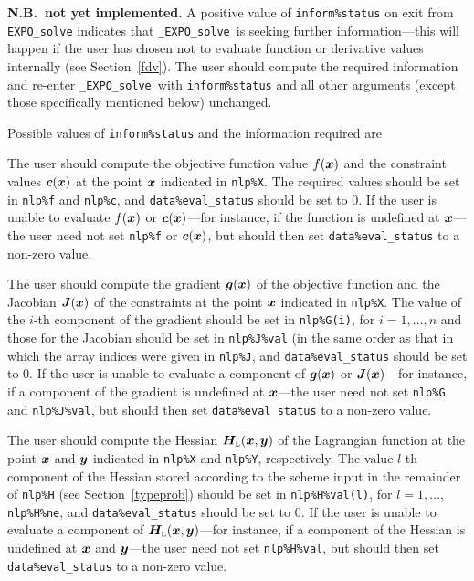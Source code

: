 \documentclass{galahad}
\newcommand{\packagename}{EXPO}
\newcommand{\fullpackagename}{\libraryname\_\packagename}
\newcommand{\solver}{{\tt \fullpackagename\_solve}}
\newcommand{\bmHL}{\bmH\sub{L}}
\begin{document}
{\bf N.B.\ not yet implemented.}
A positive value of {\tt inform\%status} on exit from
{\tt \packagename\_solve}
indicates that
\solver\ is seeking further information---this will happen
if the user has chosen not to evaluate function or
derivative values internally (see Section~\ref{fdv}).
The user should compute the required information and re-enter \solver\
with {\tt inform\%status} and all other arguments (except those specifically
mentioned below) unchanged.

Possible values of {\tt inform\%status} and the information required are
\begin{description}
 The user should compute the objective function value $f({\bm{x}})$ 
     and the constraint values ${\bm{c}}({\bm{x}})$ at the point ${\bm{x}}$ indicated 
     in {\tt nlp\%X}.
     The required values should be set in {\tt nlp\%f} and {\tt nlp\%c}, and
     {\tt data\%eval\_status} should be set to 0. If the user is
     unable to evaluate $f({\bm{x}})$ or ${\bm{c}}({\bm{x}})$---for instance, if the 
     function is undefined at ${\bm{x}}$---the user need not set {\tt nlp\%f}
     or ${\bm{c}}({\bm{x}})$, but
     should then set {\tt data\%eval\_status} to a non-zero value.

 The user should compute the gradient ${\bm{g}}({\bm{x}})$ of the 
     objective function and the Jacobian ${\bm{J}}({\bm{x}})$ of the constraints
     at the point ${\bm{x}}$ indicated in {\tt nlp\%X}.
     The value of the $i$-th component of the gradient should be set
     in {\tt nlp\%G(i)}, for $i = 1, \ldots, n$ and those for the
     Jacobian should be set in  {\tt nlp\%J\%val}
     (in the same order as that in which the array indices were given 
     in {\tt nlp\%J},  and {\tt data\%eval\_status} should be set to 0. 
     If the user is unable to evaluate a component of ${\bm{g}}({\bm{x}})$ or 
     ${\bm{J}}({\bm{x}})$---for  instance, if a component of the gradient is
     undefined at ${\bm{x}}$---the user need not set {\tt nlp\%G} and 
     {\tt nlp\%J\%val}, but  should then set {\tt data\%eval\_status} 
     to a non-zero value.

 The user should compute the Hessian $\bmHL(\bmx,\bmy)$
     of the Lagrangian function at the point ${\bm{x}}$ and ${\bm{y}}$
     indicated in {\tt nlp\%X} and {\tt nlp\%Y}, respectively.
     The value $l$-th component of the Hessian stored according to the
     scheme input in the remainder of {\tt nlp\%H} (see Section~\ref{typeprob})
     should be set in {\tt nlp\%H\%val(l)}, for $l = 1, \ldots,$ 
     {\tt nlp\%H\%ne}, and {\tt data\%eval\_status} should be set to 0. 
     If the user is  unable to evaluate a component of $\bmHL(\bmx,\bmy)$---for
     instance, if a component of the Hessian is
     undefined at ${\bm{x}}$ and ${\bm{y}}$---the user need not set
     {\tt nlp\%H\%val}, but should then set {\tt data\%eval\_status} 
     to a non-zero value.


\end{description}
\end{document}
